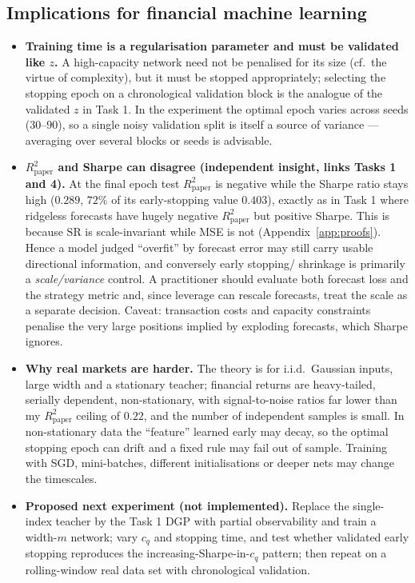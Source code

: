\documentclass[11pt,a4paper]{article}
\newcommand{\Rpaper}{R^2_{\mathrm{paper}}}
\newcommand{\SR}{\mathrm{SR}}
\begin{document}
\subsection{Implications for financial machine learning}
\begin{itemize}
\item \textbf{Training time is a regularisation parameter and must be validated like $z$.} A high-capacity network need not be penalised for its size (cf.\ the virtue of complexity), but it must be stopped appropriately; selecting the stopping epoch on a chronological validation block is the analogue of the validated $z$ in Task 1. In the experiment the optimal epoch varies across seeds ($30$--$90$), so a single noisy validation split is itself a source of variance --- averaging over several blocks or seeds is advisable.
\item \textbf{$\Rpaper$ and Sharpe can disagree (independent insight, links Tasks 1 and 4).} At the final epoch test $\Rpaper$ is negative while the Sharpe ratio stays high ($0.289$, $72\%$ of its early-stopping value $0.403$), exactly as in Task 1 where ridgeless forecasts have hugely negative $\Rpaper$ but positive Sharpe. This is because $\SR$ is scale-invariant while MSE is not (Appendix~\ref{app:proofs}).
Hence a model judged ``overfit'' by forecast error may still carry usable directional information, and conversely early stopping/ shrinkage is primarily a \emph{scale/variance} control. A practitioner should evaluate both forecast loss and the strategy metric and, since leverage can rescale forecasts, treat the scale as a separate decision.
Caveat: transaction costs and capacity constraints penalise the very large positions implied by exploding forecasts, which Sharpe ignores.
\item \textbf{Why real markets are harder.} The theory is for i.i.d.\ Gaussian inputs, large width and a stationary teacher; financial returns are heavy-tailed, serially dependent, non-stationary, with signal-to-noise ratios far lower than my $\Rpaper$ ceiling of $0.22$, and the number of independent samples is small. In non-stationary data the ``feature'' learned early may decay, so the optimal stopping epoch can drift and a fixed rule may fail out of sample. Training with SGD, mini-batches, different initialisations or deeper nets may change the timescales.
\item \textbf{Proposed next experiment (not implemented).} Replace the single-index teacher by the Task 1 DGP with partial observability and train a width-$m$ network; vary $c_q$ and stopping time, and test whether validated early stopping reproduces the increasing-Sharpe-in-$c_q$ pattern; then repeat on a rolling-window real data set with chronological validation.
\end{itemize}
\end{document}
